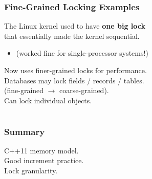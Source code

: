 \begin{frame}
  \frametitle{Fine-Grained Locking Examples}

  
    The Linux kernel used to have {\bf one big lock}\\ that essentially made
      the kernel sequential. 
    \begin{itemize}
      \item (worked fine for single-processor systems!)
    \end{itemize}
    Now uses finer-grained locks for performance.\\[2em]

    Databases may lock fields / records / tables.\\
    \qquad  (fine-grained $\rightarrow$ coarse-grained).\\[1em]

    Can lock individual objects.
  

\end{frame}



\section{}
\begin{frame}
  \frametitle{Summary}

  
 C++11 memory model.\\
 
 Good increment practice. \\

 Lock granularity.

  
\end{frame}



